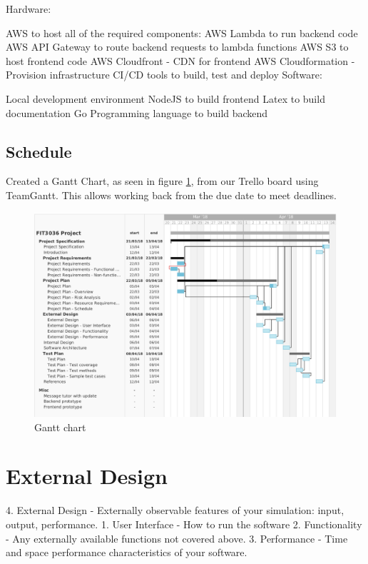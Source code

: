 \documentclass[a4paper,11pt]{article}
\begin{document}
Hardware:

AWS to host all of the required components:
AWS Lambda to run backend code
AWS API Gateway to route backend requests to lambda functions
AWS S3 to host frontend code
AWS Cloudfront - CDN for frontend
AWS Cloudformation - Provision infrastructure
CI/CD tools to build, test and deploy
Software:

Local development environment
NodeJS to build frontend
Latex to build documentation
Go Programming language to build backend

\subsection{Schedule}


Created a Gantt Chart, as seen in figure \ref{fig:gantt}, from our Trello board using TeamGantt. This allows working back from the due date to meet deadlines.

\begin{figure}[H]
\includegraphics[width=\textwidth]{gantt-chart}
\caption{Gantt chart}
    \label{fig:gantt}
\end{figure}


\section{External Design}


4. External Design - Externally observable features of your simulation: input, output, performance.
  1. User Interface - How to run the software
  2. Functionality - Any externally available functions not covered above.
  3. Performance - Time and space performance characteristics of your software.
\end{document}

